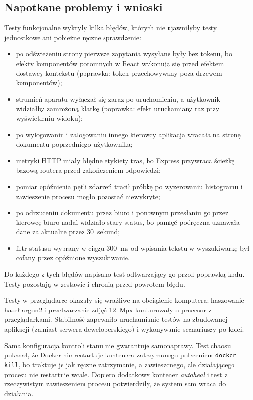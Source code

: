 \subsection{Napotkane problemy i wnioski}

Testy funkcjonalne wykryły kilka błędów, których nie ujawniłyby testy
jednostkowe ani pobieżne ręczne sprawdzenie:
\begin{itemize}
  \item po odświeżeniu strony pierwsze zapytania wysyłane były bez tokenu,
        bo efekty komponentów potomnych w React wykonują się przed efektem
        dostawcy kontekstu (poprawka: token przechowywany poza drzewem
        komponentów);
  \item strumień aparatu wyłączał się zaraz po uruchomieniu, a użytkownik
        widziałby zamrożoną klatkę (poprawka: efekt uruchamiany raz przy
        wyświetleniu widoku);
  \item po wylogowaniu i zalogowaniu innego kierowcy aplikacja wracała na
        stronę dokumentu poprzedniego użytkownika;
  \item metryki HTTP miały błędne etykiety tras, bo Express przywraca
        ścieżkę bazową routera przed zakończeniem odpowiedzi;
  \item pomiar opóźnienia pętli zdarzeń tracił próbkę po wyzerowaniu
        histogramu i zawieszenie procesu mogło pozostać niewykryte;
  \item po odrzuceniu dokumentu przez biuro i ponownym przesłaniu go przez
        kierowcę biuro nadal widziało stary status, bo pamięć podręczna
        uznawała dane za aktualne przez 30~sekund;
  \item filtr statusu wybrany w ciągu 300~ms od wpisania tekstu w wyszukiwarkę
        był cofany przez opóźnione wyszukiwanie.
\end{itemize}
Do każdego z tych błędów napisano test odtwarzający go przed poprawką kodu.
Testy pozostają w zestawie i chronią przed powrotem błędu.

Testy w przeglądarce okazały się wrażliwe na obciążenie komputera: haszowanie haseł argon2 i przetwarzanie
zdjęć 12~Mpx konkurowały o procesor z przeglądarkami. Stabilność zapewniło
uruchamianie testów na zbudowanej aplikacji (zamiast serwera deweloperskiego)
i wykonywanie scenariuszy po kolei.

Sama konfiguracja kontroli stanu nie gwarantuje samonaprawy. Test chaosu
pokazał, że Docker nie restartuje
kontenera zatrzymanego poleceniem \texttt{docker kill}, bo traktuje je jak
ręczne zatrzymanie, a zawieszonego, ale działającego procesu nie restartuje
wcale. Dopiero dodatkowy kontener \emph{autoheal} i test z rzeczywistym
zawieszeniem procesu potwierdziły, że system sam wraca do działania.

